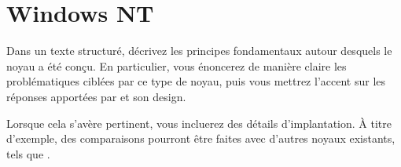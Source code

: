 %
%

\section{Windows NT
         }

Dans un texte structur\'e, d\'ecrivez les principes fondamentaux autour
desquels le noyau  a \'et\'e con\c{c}u. En particulier, vous
\'enoncerez de mani\`ere claire les probl\'ematiques cibl\'ees par ce type de
noyau, puis vous mettrez l'accent sur les r\'eponses apport\'ees par 
et son design.

Lorsque cela s'av\`ere pertinent, vous incluerez des d\'etails d'implantation.
\`A titre d'exemple, des comparaisons pourront \^etre faites avec d'autres
noyaux existants, tels que .

